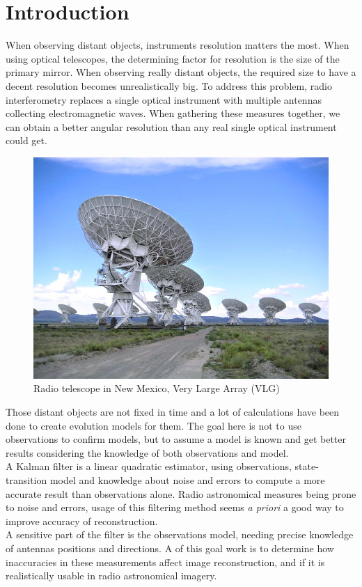 \documentclass[titlepage]{article}
\begin{document}
	\newpage
	\part{Introduction}
	
	When observing distant objects, instruments resolution matters the most. When using optical telescopes, the determining factor for resolution is the size of the primary mirror. When observing really distant objects, the required size to have a decent resolution becomes unrealistically big. To address this problem, radio interferometry replaces a single optical instrument with multiple antennas collecting electromagnetic waves. When gathering these measures together, we can obtain a better angular resolution than any real single optical instrument could get. \\
	
	\begin{figure}[H]
		\centering
		\includegraphics[width=.5\linewidth]{src/radioastro}
		\caption{Radio telescope in New Mexico, Very Large Array (VLG)}
	\end{figure}
	
	Those distant objects are not fixed in time and a lot of calculations have been done to create evolution models for them. The goal here is not to use observations to confirm models, but to assume a model is known and get better results considering the knowledge of both observations and model. \\ 
	
	A Kalman filter is a linear quadratic estimator, using observations, state-transition model and knowledge about noise and errors to compute a more accurate result than observations alone. Radio astronomical measures being prone to noise and errors, usage of this filtering method seems \emph{a priori} a good way to improve accuracy of reconstruction. \\
		
	A sensitive part of the filter is the observations model, needing precise knowledge of antennas positions and directions. A of this goal work is to determine how inaccuracies in these measurements affect image reconstruction, and if it is realistically usable in radio astronomical imagery. \\
	
\end{document}

